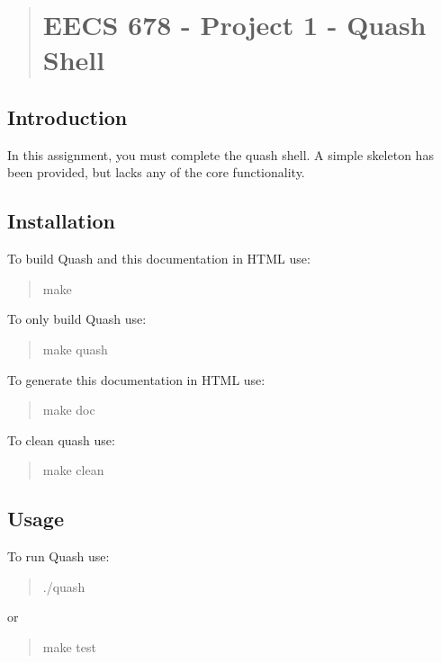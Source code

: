 \begin{quotation}
\section*{E\-E\-C\-S 678 -\/ Project 1 -\/ Quash Shell}



\end{quotation}


\subsection*{Introduction}

In this assignment, you must complete the quash shell. A simple skeleton has been provided, but lacks any of the core functionality.

\subsection*{Installation}

To build Quash and this documentation in H\-T\-M\-L use\-: \begin{quotation}
{\ttfamily make}

\end{quotation}


To only build Quash use\-: \begin{quotation}
{\ttfamily make quash}

\end{quotation}


To generate this documentation in H\-T\-M\-L use\-: \begin{quotation}
{\ttfamily make doc}

\end{quotation}


To clean quash use\-: \begin{quotation}
{\ttfamily make clean}

\end{quotation}


\subsection*{Usage}

To run Quash use\-: \begin{quotation}
{\ttfamily ./quash}

\end{quotation}
or \begin{quotation}
{\ttfamily make test} \end{quotation}
